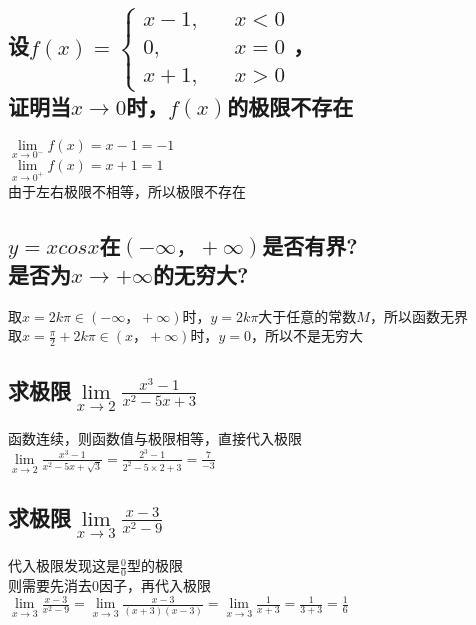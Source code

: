\documentclass{article}
\begin{document}
\begin{flushleft}
\subsection{
设$f(x)=\left\{
\begin{array}{rcl}
x-1,& & x<0\\
0,& & x=0\\
x+1,& & x>0
\end{array} \right.$，\\
证明当$x\to 0$时，$f(x)$的极限不存在
}
$\lim\limits_{x\to 0^-}f(x)=x-1=-1$\\
$\lim\limits_{x\to 0^+}f(x)=x+1=1$\\
由于左右极限不相等，所以极限不存在\\

\subsection{
$y=xcosx$在$(-\infty，+\infty)$是否有界?\\
是否为$x\to +\infty$的无穷大?
}
取$x=2k\pi\in(-\infty，+\infty)$时，$y=2k\pi$大于任意的常数$M$，所以函数无界\\
取$x=\frac{\pi}{2}+2k\pi\in(x，+\infty)$时，$y=0$，所以不是无穷大\\

\subsection{
求极限$\lim\limits_{x\to 2}\frac{x^3-1}{x^2-5x+3}$
}
函数连续，则函数值与极限相等，直接代入极限\\
$\lim\limits_{x\to 2}\frac{x^3-1}{x^2-5x+\sqrt3}=\frac{2^3-1}{2^2-5\times2+3}=\frac{7}{-3}$\\

\subsection{
求极限$\lim\limits_{x\to 3}\frac{x-3}{x^2-9}$
}
代入极限发现这是$\frac{0}{0}$型的极限\\
则需要先消去$0$因子，再代入极限\\
$\lim\limits_{x\to 3}\frac{x-3}{x^2-9}=\lim\limits_{x\to 3}\frac{x-3}{(x+3)(x-3)}=\lim\limits_{x\to 3}\frac{1}{x+3}=\frac{1}{3+3}=\frac{1}{6}$\\


\end{flushleft}
\end{document}
